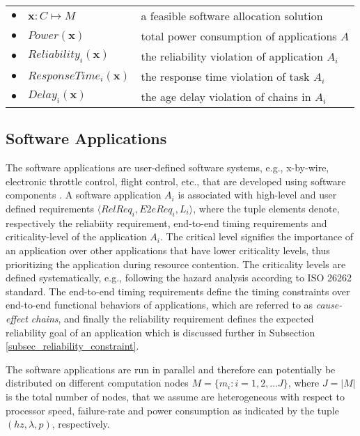 \begin{table}[]
\begin{tabular}{@{}llp{}@{}}
$\bullet$ & $\textbf{x}:C\mapsto M$            & a feasible software allocation solution                  \\
$\bullet$ & $Power(\textbf{x})$                & total power consumption of applications $A$               \\
$\bullet$ & $Reliability_{i}(\textbf{x})$      & the reliability violation of application $A_i$              \\
$\bullet$ & $ResponseTime_{i}(\textbf{x})$     & the response time violation of task $A_i$                       \\
$\bullet$ & $Delay_{i}(\textbf{x})$            & the age delay violation of chains in $A_i$         \\
\bottomrule
\end{tabular}
\end{table}

\subsection{Software Applications}
The software applications are user-defined software systems, e.g., x-by-wire, electronic throttle control, flight control, etc., that are developed using software components \cite{softwarecomponents}\cite{Crnkovic2002BuildingSystems}. A software application $A_i$ is associated with high-level and user defined requirements $\langle RelReq_i, E2eReq_i,L_i\rangle$, where the tuple elements denote, respectively the reliabiity requirement, end-to-end timing requirements and criticality-level of the application $A_i$. The critical level signifies the importance of an application over other applications that have lower criticality levels, thus prioritizing the application during resource contention. The criticality levels are defined systematically, e.g., following the hazard analysis according to ISO 26262 standard. The end-to-end timing requirements define the timing constraints over end-to-end functional behaviors of applications, which are referred to as \textit{cause-effect chains}, and finally the reliability requirement defines the expected reliability goal of an application which is discussed further in Subsection \ref{subsec_reliability_constraint}. 

The software applications are run in parallel and therefore can potentially be distributed on different computation nodes $M =\{m_i:i=1,2,\dots J\}$, where $J=|M|$ is the total number of nodes, that we assume are heterogeneous with respect to processor speed, failure-rate and power consumption as indicated by the tuple $(hz, \lambda, p)$, respectively. 

